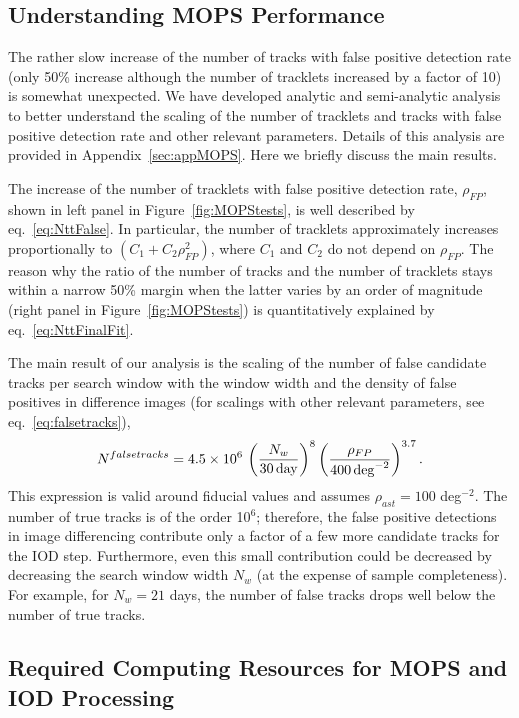 \subsection{Understanding MOPS Performance}

The rather slow increase of the number of tracks with false positive detection rate (only 50\% increase
although the number of tracklets increased by a factor of 10) is somewhat unexpected. We have
developed analytic and semi-analytic analysis to better understand the scaling of the number of
tracklets and tracks with false positive detection rate and other relevant parameters. Details of this
analysis are provided in Appendix~\ref{sec:appMOPS}. Here we briefly discuss the main results.

The increase of the number of tracklets with false positive detection rate, $\rho_{FP}$, shown in left panel
in Figure~\ref{fig:MOPStests}, is well described by eq.~\ref{eq:NttFalse}. In particular, the number of tracklets
approximately increases proportionally to $(C_1 + C_2\rho_{FP}^2)$, where $C_1$ and $C_2$ do not
depend on $\rho_{FP}$. The reason why the ratio of the number of tracks and the number of tracklets
stays within a narrow 50\% margin when the latter varies by an order of magnitude (right panel
in Figure~\ref{fig:MOPStests}) is quantitatively explained by eq.~\ref{eq:NttFinalFit}.

The main result of our analysis is the scaling of the number of false candidate tracks per search window
with the window width and the density of false positives in difference images (for scalings with other relevant
parameters, see eq.~\ref{eq:falsetracks}),
\begin{equation}
\label{eq:falsetracks2}
   N^{falsetracks} = 4.5 \times 10^6 \, \left( {N_w \over 30 \, {\rm day} } \right)^{8} \left( {\rho_{FP} \over 400 \, {\rm deg}^{-2} }\right)^{3.7}.
\end{equation}
This expression is valid around fiducial values and assumes $\rho_{ast}=100$ deg$^{-2}$.
The number of true tracks is of the order 10$^6$; therefore, the false positive detections
in image differencing contribute only a factor of a few more candidate tracks for the IOD step.
Furthermore, even this small contribution could be decreased by decreasing the search window
width $N_w$ (at the expense of sample completeness). For example, for $N_w=21$ days,
the number of false tracks drops well below the number of true tracks.


\subsection{Required Computing Resources for MOPS and IOD Processing}

